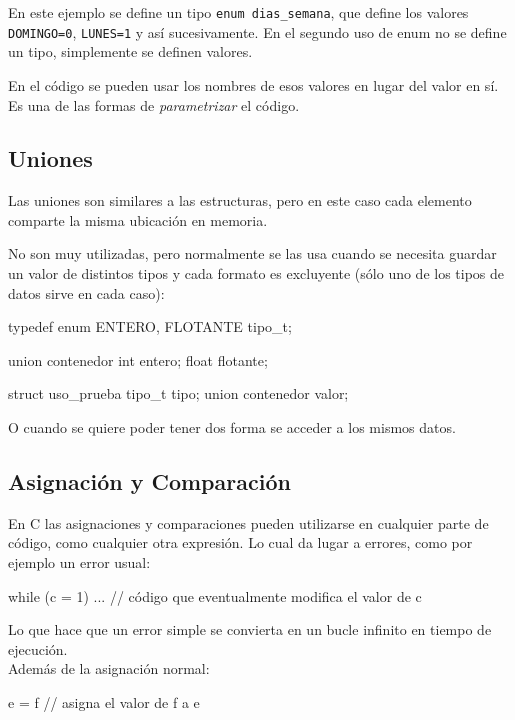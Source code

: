 En este ejemplo se define un tipo \lstinline!enum dias_semana!, que define los
valores \lstinline!DOMINGO=0!, \lstinline!LUNES=1! y así sucesivamente. En el
segundo uso de enum no se define un tipo, simplemente se definen valores.

En el código se pueden usar los nombres de esos valores en lugar del valor
en sí. Es una de las formas de \textit{parametrizar} el código.

\subsection{Uniones}

Las uniones son similares a las estructuras, pero en este caso cada elemento
comparte la misma ubicación en memoria.

No son muy utilizadas, pero normalmente se las usa cuando se necesita guardar
un valor de distintos tipos y cada formato es excluyente (sólo uno de los
tipos de datos sirve en cada caso):

\begin{codigo-c-plano}
typedef enum {ENTERO, FLOTANTE} tipo_t;

union contenedor {
    int entero;
    float flotante;
}

struct uso_prueba {
    tipo_t tipo;
    union contenedor valor;
}
\end{codigo-c-plano}

O cuando se quiere poder tener dos forma se acceder a los mismos datos.

\subsection{Asignación y Comparación}

En C las asignaciones y comparaciones pueden utilizarse en cualquier parte de
código, como cualquier otra expresión. Lo cual da lugar a errores, como por
ejemplo un error usual:

\begin{codigo-c-plano}
while (c = 1) {
    ... // código que eventualmente modifica el valor de c
}
\end{codigo-c-plano}

Lo que hace que un error simple se convierta en un bucle infinito en tiempo de
ejecución. \\

Además de la asignación normal:

\begin{codigo-c-plano}
e = f // asigna el valor de f a e
\end{codigo-c-plano}

